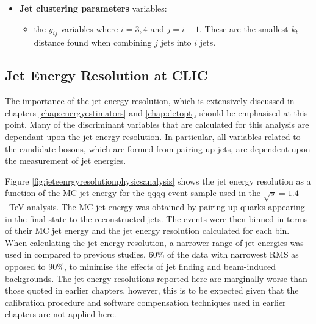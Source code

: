 \begin{itemize}
\item \textbf{Jet clustering parameters} variables:
\begin{itemize}
\item the $y_{ij}$ variables where $i = 3,4$ and $j=i+1$.  These are the smallest $k_{t}$ distance found when combining $j$ jets into $i$ jets.  
\end{itemize}
\end{itemize}


\subsection{Jet Energy Resolution at CLIC} 
\label{sec:jetenergyresolution}
The importance of the jet energy resolution, which is extensively discussed in chapters \ref{chap:energyestimators} and \ref{chap:detopt}, should be emphasised at this point.  Many of the discriminant variables that are calculated for this analysis are dependant upon the jet energy resolution.  In particular, all variables related to the candidate bosons, which are formed from pairing up jets, are dependent upon the measurement of jet energies.  

Figure \ref{fig:jeteenrgyresolutionphysicsanalysis} shows the jet energy resolution as a function of the MC jet energy for the {\nu}{\nu}qqqq event sample used in the $\sqrt{s}=1.4$~TeV analysis.  The MC jet energy was obtained by pairing up quarks appearing in the final state to the reconstructed jets.  The events were then binned in terms of their MC jet energy and the jet energy resolution calculated for each bin.  When calculating the jet energy resolution, a narrower range of jet energies was used in compared to previous studies, 60\% of the data with narrowest RMS as opposed to 90\%, to minimise the effects of jet finding and beam-induced backgrounds.  {The jet energy resolutions reported here are marginally worse than those quoted in earlier chapters, however, this is to be expected given that the calibration procedure and software compensation techniques used in earlier chapters are not applied here.}

